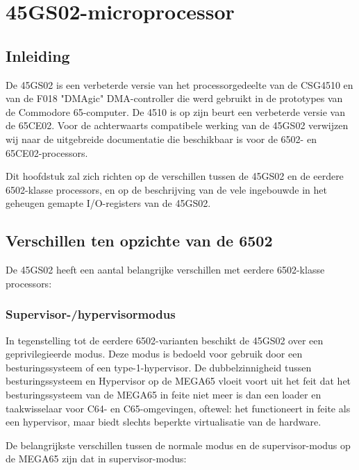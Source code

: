 \chapter{45GS02-microprocessor}
\label{cha:cpu}
\label{cha:45gs02}
\section{Inleiding}

De 45GS02 is een verbeterde versie van het processorgedeelte van de CSG4510 en van de F018 "DMAgic" DMA-controller die werd gebruikt in de prototypes van de Commodore 65-computer. De 4510 is op zijn beurt een verbeterde versie van de 65CE02. Voor de achterwaarts compatibele werking van de 45GS02 verwijzen wij naar de uitgebreide documentatie die beschikbaar is voor de 6502- en 65CE02-processors.

Dit hoofdstuk zal zich richten op de verschillen tussen de 45GS02 en de eerdere 6502-klasse processors, en op de beschrijving van de vele ingebouwde in het geheugen gemapte I/O-registers van de 45GS02.

\section{Verschillen ten opzichte van de 6502}

De 45GS02 heeft een aantal belangrijke verschillen met eerdere 6502-klasse processors:

\subsection{Supervisor-/hypervisormodus}

In tegenstelling tot de eerdere 6502-varianten beschikt de 45GS02 over een geprivilegieerde modus. Deze modus is bedoeld voor gebruik door een besturingssysteem of een type-1-hypervisor. De dubbelzinnigheid tussen besturingssysteem en Hypervisor op de MEGA65 vloeit voort uit het feit dat het besturingssysteem van de MEGA65 in feite niet meer is dan een loader en taakwisselaar voor C64- en C65-omgevingen, oftewel: het functioneert in feite als een hypervisor, maar biedt slechts beperkte virtualisatie van de hardware.

De belangrijkste verschillen tussen de normale modus en de supervisor-modus op de MEGA65 zijn dat in supervisor-modus:

